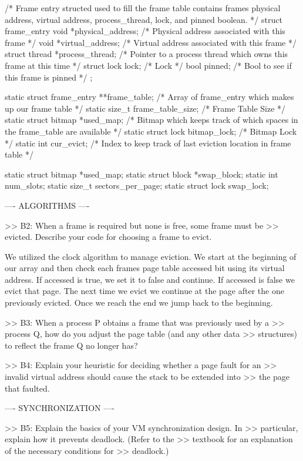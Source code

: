 /* Frame entry structed used to fill the frame table 
contains frames physical address, virtual address,
process_thread, lock, and pinned boolean. */
struct frame_entry
{
    void *physical_address;         /* Physical address associated with this frame */
    void *virtual_address;          /* Virtual address associated with this frame */
    struct thread *process_thread;  /* Pointer to a process thread which owns this frame at this time */
    struct lock lock;               /* Lock */
    bool pinned;                    /* Bool to see if this frame is pinned */
};

static struct frame_entry **frame_table;    /* Array of frame_entry which makes up our frame table */
static size_t frame_table_size;             /* Frame Table Size */
static struct bitmap *used_map;             /* Bitmap which keeps track of which spaces in the frame_table are available */
static struct lock bitmap_lock;             /* Bitmap Lock */
static int cur_evict;                       /* Index to keep track of last eviction location in frame table */

static struct bitmap *used_map;
static struct block *swap_block;
static int num_slots;
static size_t sectors_per_page;
static struct lock swap_lock;

---- ALGORITHMS ----

>> B2: When a frame is required but none is free, some frame must be
>> evicted.  Describe your code for choosing a frame to evict.

 We utilized the clock algorithm to manage eviction. We start at the beginning
 of our array and then check each frames page table accessed bit using its
 virtual address. If accessed is true, we set it to false and continue. If
 accessed is false we evict that page. The next time we evict we continue
 at the page after the one previously evicted. Once we reach the end we jump
 back to the beginning.


>> B3: When a process P obtains a frame that was previously used by a
>> process Q, how do you adjust the page table (and any other data
>> structures) to reflect the frame Q no longer has?


>> B4: Explain your heuristic for deciding whether a page fault for an
>> invalid virtual address should cause the stack to be extended into
>> the page that faulted.

---- SYNCHRONIZATION ----

>> B5: Explain the basics of your VM synchronization design.  In
>> particular, explain how it prevents deadlock.  (Refer to the
>> textbook for an explanation of the necessary conditions for
>> deadlock.)

